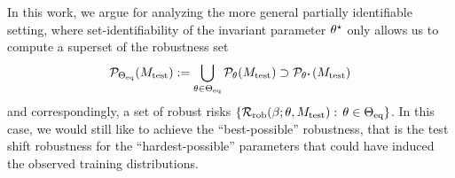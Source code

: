 In this work, we argue for analyzing the more general partially identifiable setting, where set-identifiability of the invariant parameter $\theta^{\star}$
only allows us to compute a superset
of the robustness set
\begin{align*}
    \mathcal{P}_{\Theta_{\mathrm{eq}}}(M_{\mathrm{test}}) := \bigcup_{\theta \in \Theta_{\mathrm{eq}}} \mathcal{P}_{\theta}(M_{\mathrm{test}}) \supset\mathcal{P}_{\theta^{\star}}(M_{\mathrm{test}}) 
\end{align*}
and correspondingly, a set of robust risks $\{\mathcal{R}_{\mathrm{rob}}(\beta; \theta,M_{\mathrm{test}}): \, \theta \in \Theta_{\mathrm{eq}} \}$.
In this case, we would still like to achieve the 
``best-possible'' robustness, that is %
the test shift robustness
for the ``hardest-possible'' %
parameters that could have induced the observed training distributions.
